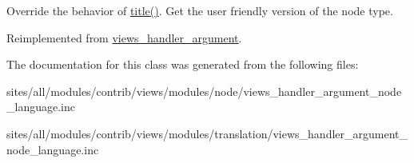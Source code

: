 Override the behavior of \hyperlink{classviews__handler__argument__node__language_b880be769744ec720d0b8e2e32671daa}{title()}. Get the user friendly version of the node type. 

Reimplemented from \hyperlink{classviews__handler__argument_76181ac24e7be4a09aaafc1fa5f15ea1}{views\_\-handler\_\-argument}.

The documentation for this class was generated from the following files:\begin{CompactItemize}
\item 
sites/all/modules/contrib/views/modules/node/views\_\-handler\_\-argument\_\-node\_\-language.inc\item 
sites/all/modules/contrib/views/modules/translation/views\_\-handler\_\-argument\_\-node\_\-language.inc\end{CompactItemize}
